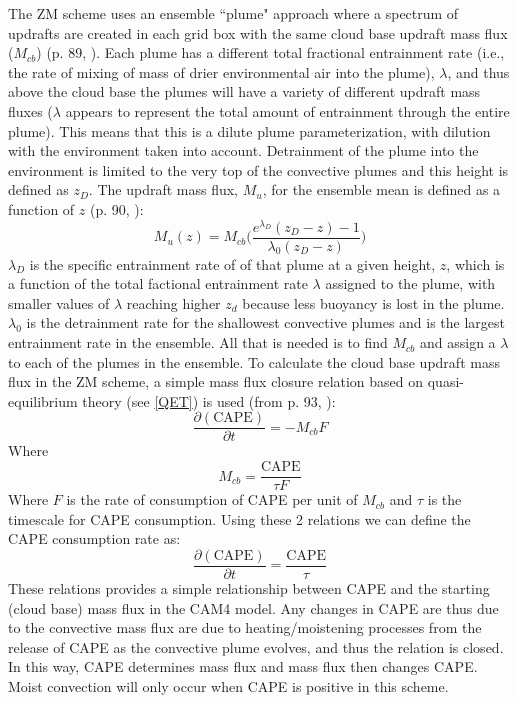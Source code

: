 \documentclass[letterpaper,12pt,titlepage,oneside,final]{book}
\begin{document}
The ZM scheme uses an ensemble ``plume" approach where a spectrum of updrafts are created in each grid box with the same cloud base updraft mass flux ($M_{cb}$) (p. 89, \citep{neale_description_2010}). Each plume has a different total fractional entrainment rate (i.e., the rate of mixing of mass of drier environmental air into the plume), $\lambda$, and thus above the cloud base the plumes will have a variety of different updraft mass fluxes ($\lambda$ appears to represent the total amount of entrainment through the entire plume). This means that this is a dilute plume parameterization, with dilution with the environment taken into account. Detrainment of the plume into the environment is limited to the very top of the convective plumes and this height is defined as $z_{D}$. The updraft mass flux, $M_{u}$, for the ensemble mean is defined as a function of $z$ (p. 90, \citep{neale_description_2010,zhang_sensitivity_1995}):
\begin{equation}\label{eq:updraft}
M_{u}(z)=M_{cb}\Bigg(\frac{e^{\lambda_{D}}(z_{D}-z)-1}{\lambda_{0}(z_{D}-z)}\Bigg)
\end{equation}
$\lambda_{D}$ is the specific entrainment rate of of that plume at a given height, $z$, which is a function of the total factional entrainment rate $\lambda$ assigned to the plume, with smaller values of $\lambda$ reaching higher $z_{d}$ because less buoyancy is lost in the plume. $\lambda_{0}$ is the detrainment rate for the shallowest convective plumes and is the largest entrainment rate in the ensemble. All that is needed is to find $M_{cb}$ and assign a $\lambda$ to each of the plumes in the ensemble. To calculate the cloud base updraft mass flux in the ZM scheme, a simple mass flux closure relation based on quasi-equilibrium theory (see \ref{QET}) is used (from p. 93, \citep{neale_description_2010}):
\begin{equation}\label{eq:closure}
\frac{\partial{(\text{CAPE})}}{\partial{t}}=-M_{cb}F
\end{equation}
Where
\begin{equation}\label{eq:closure1}
M_{cb}=\frac{\text{CAPE}}{\tau{F}}
\end{equation}
Where $F$ is the rate of consumption of CAPE per unit of $M_{cb}$ and $\tau$ is the timescale for CAPE consumption. Using these 2 relations we can define the CAPE consumption rate as:
\begin{equation}\label{eq:closure2}
\frac{\partial{(\text{CAPE})}}{\partial{t}}=\frac{\text{CAPE}}{\tau}
\end{equation}
These relations provides a simple relationship between CAPE and the starting (cloud base) mass flux in the CAM4 model. Any changes in CAPE are thus due to the convective mass flux are due to heating/moistening processes from the release of CAPE as the convective plume evolves, and thus the relation is closed. In this way, CAPE determines mass flux and mass flux then changes CAPE. Moist convection will only occur when CAPE is positive in this scheme.
\end{document}
